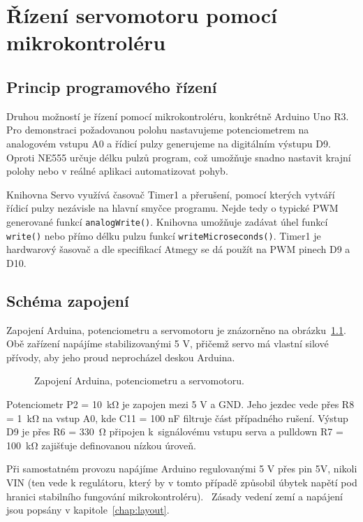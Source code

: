 
\chapter{Řízení servomotoru pomocí mikrokontroléru}
\label{chap:mikrokontroler}

\section{Princip programového řízení}

Druhou možností je řízení pomocí mikrokontroléru, konkrétně Arduino Uno R3. Pro demonstraci požadovanou polohu nastavujeme potenciometrem na analogovém vstupu A0 a řídicí pulzy generujeme na digitálním výstupu D9. Oproti NE555 určuje délku pulzů program, což umožňuje snadno nastavit krajní polohy nebo v reálné aplikaci automatizovat pohyb.

Knihovna Servo využívá časovač Timer1 a přerušení, pomocí kterých vytváří řídicí pulzy nezávisle na hlavní smyčce programu. Nejde tedy o typické PWM generované funkcí \texttt{analogWrite()}. Knihovna umožňuje zadávat úhel funkcí \texttt{write()} nebo přímo délku pulzu funkcí \texttt{writeMicroseconds()}. Timer1 je hardwarový šasovač a dle specifikací Atmegy se dá použít na PWM pinech D9 a D10.~\cite{servoimpl,servoapi}

\section{Schéma zapojení}

Zapojení Arduina, potenciometru a servomotoru je znázorněno na obrázku~\ref{fig:knob-priklad}. Obě zařízení napájíme stabilizovanými 5 V, přičemž servo má vlastní silové přívody, aby jeho proud neprocházel deskou Arduina.

\begin{figure}[htbp]\centering
\resizebox{\textwidth}{!}{}
\caption{Zapojení Arduina, potenciometru a servomotoru.}
\label{fig:knob-priklad}
\end{figure}

Potenciometr P2 = 10~k\si{\ohm} je zapojen mezi 5 V a GND. Jeho jezdec vede přes R8 = 1~k\si{\ohm} na vstup A0, kde C11 = 100 nF filtruje část případného rušení. Výstup D9 je přes R6 = 330~\si{\ohm} připojen k~signálovému vstupu serva a pulldown R7 = 100~k\si{\ohm} zajišťuje definovanou nízkou úroveň.

Při samostatném provozu napájíme Arduino regulovanými 5 V přes pin 5V, nikoli VIN (ten vede k regulátoru, který by v tomto případě způsobil úbytek napětí pod hranici stabilního fungování mikrokontroléru).~\cite{uno,arduinoPower} Zásady vedení zemí a napájení jsou popsány v kapitole~\ref{chap:layout}.


